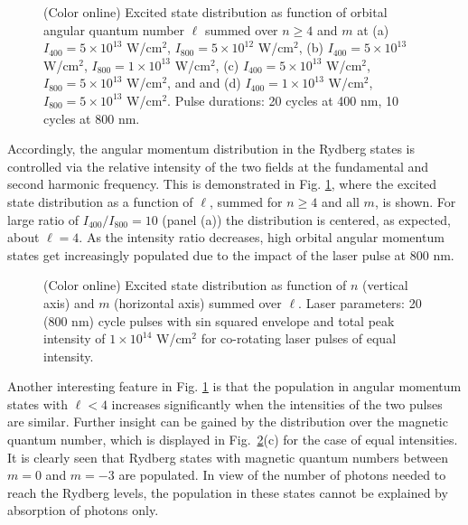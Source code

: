 \begin{figure}[!ht]
\caption{\label{fig:l-distribution}
(Color online) 
Excited state distribution as function of orbital angular quantum number $\ell$ summed over $n \ge 4$ and $m$ at 
(a) $I_{400} = 5 \times 10^{13}$ W/cm$^2$, $I_{800} = 5 \times 10^{12}$ W/cm$^2$, 
(b) $I_{400} = 5 \times 10^{13}$ W/cm$^2$, $I_{800} = 1 \times 10^{13}$ W/cm$^2$, 
(c) $I_{400} = 5 \times 10^{13}$ W/cm$^2$, $I_{800} = 5 \times 10^{13}$ W/cm$^2$, and
and (d) $I_{400} = 1 \times 10^{13}$ W/cm$^2$, $I_{800} = 5 \times 10^{13}$ W/cm$^2$. Pulse durations: 20 cycles at 400 nm, 10 cycles at 800 nm.
}
\end{figure}

Accordingly, the angular momentum distribution in the Rydberg states is controlled via the relative intensity of the two fields at the fundamental and second harmonic frequency. This is demonstrated in Fig. \ref{fig:l-distribution}, where the excited state distribution as a function of $\ell$, summed for $n \ge 4$ and all $m$, is shown. For large ratio of $I_{400}/I_{800} = 10$ (panel (a)) the distribution is centered, as expected, about $\ell = 4$. As the intensity ratio decreases, high orbital angular momentum states get increasingly populated due to the impact of the laser pulse at 800 nm. 

\begin{figure}[!ht]
\caption{\label{fig:nm-distribution}
(Color online) 
Excited state distribution as function of $n$ (vertical axis) and $m$ (horizontal axis) summed over $\ell$. Laser parameters: 20 (800 nm) cycle pulses with sin squared envelope and total peak intensity of $1\times10^{14}$ W/cm$^2$ for co-rotating laser pulses of equal intensity. 
}
\end{figure}

Another interesting feature in Fig. \ref{fig:l-distribution} is that the population in angular momentum states with $\ell < 4$ increases significantly when the intensities of the two pulses are similar. Further insight can be gained by the distribution over the magnetic quantum number, which is displayed in Fig.~\ref{fig:nm-distribution}(c) for the case of equal intensities. It is clearly seen that Rydberg states with magnetic quantum numbers between $m=0$ and $m=-3$ are populated. In view of the number of photons needed to reach the Rydberg levels, the population in these states cannot be explained by absorption of photons only. 

